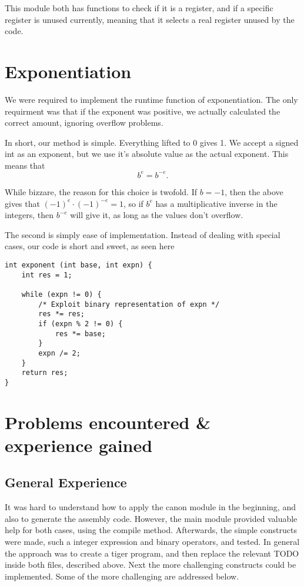 \documentclass{article}
\begin{document}
This module both has functions to check if it is a register, and if a specific register is unused currently, meaning that it selects a real register unused by the code.

\section{Exponentiation}
We were required to implement the runtime function of exponentiation. The only requirment was that if the exponent was positive, we actually calculated the correct amount, ignoring overflow problems.

In short, our method is simple. Everything lifted to 0 gives 1. We accept a signed int as an exponent, but we use it's absolute value as the actual exponent. This means that
\[
b^{e} = b^{-e}.
\]

While bizzare, the reason for this choice is twofold. If $b = -1$, then the above gives that $(-1)^{e} \cdot (-1)^{-e} = 1$, so if $b^e$ has a multiplicative inverse in the integers, then $b^{-e}$ will give it, as long as the values don't overflow.

The second is simply ease of implementation. Instead of dealing with special cases, our code is short and sweet, as seen here
\begin{verbatim}
int exponent (int base, int expn) {
    int res = 1;

    while (expn != 0) {
        /* Exploit binary representation of expn */
        res *= res;
        if (expn % 2 != 0) {
            res *= base;
        }
        expn /= 2;
    }
    return res;
}
\end{verbatim}
\section{Problems encountered \& experience gained}

\subsection{General Experience}
It was hard to understand how to apply the canon module in the beginning, and also to generate the assembly code. However, the main module provided valuable help for both cases, using the compile method. Afterwards, the simple constructs were made, such a integer expression and binary operators, and tested. In general the approach was to create a tiger program, and then replace the relevant TODO inside both files, described above.
Next the more challenging constructs could be implemented. Some of the more challenging are addressed below.  
\end{document}
